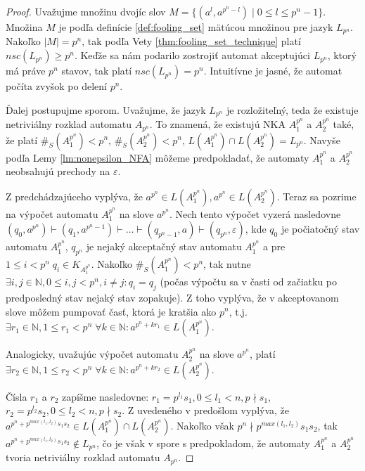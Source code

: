 \begin{proof}
Uvažujme množinu dvojíc slov $ M = \lbrace (a^{l},a^{p^n-l}) \; | \; 0 \leq l \leq p^n-1 \rbrace $. Množina $ M $ je podľa definície \ref{def:fooling_set} mätúcou množinou pre jazyk $ L_{p^n} $. Nakoľko $ |M|=p^n $, tak podľa Vety \ref{thm:fooling_set_technique} platí $ nsc(L_{p^n}) \geq p^n $. Keďže sa nám podarilo zostrojiť automat akceptujúci $ L_{p^n} $, ktorý má práve $ p^n $ stavov, tak platí $ nsc(L_{p^n}) = p^n$. Intuitívne je jasné, že automat počíta zvyšok po delení $ p^n $.
\par
Ďalej postupujme sporom. Uvažujme, že jazyk $ L_{p^n} $ je rozložiteľný, teda že existuje netriviálny rozklad automatu $ A_{p^n} $. To znamená, že existujú NKA $ A_1^{p^n} $ a $ A_2^{p^n} $ také, že platí $ \#_S(A_1^{p^n}) < p^n $, $ \#_S(A_2^{p^n}) < p^n $, $ L(A_1^{p^n}) \cap L(A_2^{p^n}) = L_{p^n} $. Navyše podľa Lemy \ref{lm:nonepsilon_NFA} môžeme predpokladať, že automaty $ A_1^{p^n}$ a $ A_2^{p^n} $ neobsahujú prechody na $ \varepsilon $. 
\par
Z predchádzajúceho vyplýva, že $ a^{p^n} \in L(A_1^{p^n}), a^{p^n} \in L(A_2^{p^n})$. Teraz sa pozrime na výpočet automatu $ A_1^{p^n} $ na slove $ a^{p^n} $. Nech tento výpočet vyzerá nasledovne $ (q_0,a^{p^n}) \vdash (q_1,a^{p^n-1}) \vdash \dots \vdash (q_{p^n-1},a) \vdash (q_{p^n},\varepsilon) $, kde $ q_0 $ je počiatočný stav automatu $ A_1^{p^n} $, $ q_{p^n} $ je nejaký akceptačný stav automatu $ A_1^{p^n} $ a pre $ 1 \leq i < p^n \; q_i \in K_{A_1^{p^n}}$. Nakoľko $ \#_S(A_1^{p^n}) < p^n $, tak nutne $ \exists i,j \in \mathbb{N}, 0 \leq i,j < p^n, i \neq j: q_i = q_j $ (počas výpočtu sa v časti od začiatku po predposledný stav nejaký stav zopakuje). Z toho vyplýva, že v akceptovanom slove môžem pumpovať časť, ktorá je kratšia ako $ p^n $, t.j. $ \exists r_1 \in \mathbb{N}, 1 \leq r_1 < p^n \; \forall k \in \mathbb{N}: a^{p^n+kr_1} \in L(A_1^{p^n})$. 
\par
Analogicky, uvažujúc výpočet automatu $ A_2^{p^n} $ na slove $ a^{p^n} $, platí $ \exists r_2 \in \mathbb{N}, 1 \leq r_2 < p^n \; \forall k \in \mathbb{N}: a^{p^n+kr_2} \in L(A_2^{p^n})$.
\par
Čísla $ r_1 $ a $ r_2 $ zapíšme nasledovne: $ r_1 = p^{l_1}s_1, 0 \leq l_1 < n, p \nmid s_1 $, $ r_2 = p^{l_2}s_2, 0 \leq l_2 < n, p \nmid s_2 $. Z uvedeného v predošlom vyplýva, že $ a^{p^n + p^{max(l_1,l_2)}s_1s_2} \in L(A_1^{p^n}) \cap L(A_2^{p^n}) $. Nakoľko však $ p^n \nmid p^{max(l_1,l_2)}s_1s_2$, tak $ a^{p^n + p^{max(l_1,l_2)}s_1s_2} \notin L_{p^n} $, čo je však v spore s predpokladom, že automaty $ A_1^{p^n} $ a $ A_2^{p^n} $ tvoria netriviálny rozklad automatu $ A_{p^n} $.
\end{proof}

